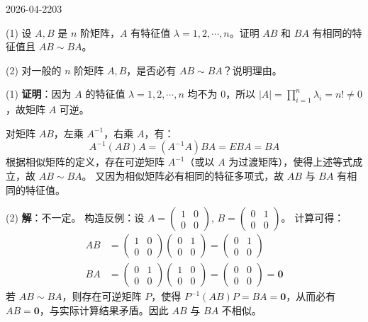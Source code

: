 \begin{mistake}{2026-04-22}{03}

\begin{problemcontent}
(1) 设 \(A, B\) 是 \(n\) 阶矩阵，\(A\) 有特征值 \(\lambda = 1, 2, \cdots, n\)。证明 \(AB\) 和 \(BA\) 有相同的特征值且 \(AB \sim BA\)。

(2) 对一般的 \(n\) 阶矩阵 \(A, B\)，是否必有 \(AB \sim BA\)？说明理由。
\end{problemcontent}

\begin{solutioncontent}
(1) \textbf{证明}：因为 \(A\) 的特征值 \(\lambda = 1, 2, \cdots, n\) 均不为 0，所以 \(|A| = \prod_{i=1}^n \lambda_i = n! \neq 0\)，故矩阵 \(A\) 可逆。

对矩阵 \(AB\)，左乘 \(A^{-1}\)，右乘 \(A\)，有：
\[
A^{-1}(AB)A = (A^{-1}A)BA = EBA = BA
\]
根据相似矩阵的定义，存在可逆矩阵 \(A^{-1}\)（或以 \(A\) 为过渡矩阵），使得上述等式成立，故 \(AB \sim BA\)。
又因为相似矩阵必有相同的特征多项式，故 \(AB\) 与 \(BA\) 有相同的特征值。

(2) \textbf{解}：不一定。
构造反例：设 \(A = \begin{pmatrix} 1 & 0 \\ 0 & 0 \end{pmatrix}\), \(B = \begin{pmatrix} 0 & 1 \\ 0 & 0 \end{pmatrix}\)。
计算可得：
\[
\begin{aligned}
AB &= \begin{pmatrix} 1 & 0 \\ 0 & 0 \end{pmatrix} \begin{pmatrix} 0 & 1 \\ 0 & 0 \end{pmatrix} = \begin{pmatrix} 0 & 1 \\ 0 & 0 \end{pmatrix} \\
BA &= \begin{pmatrix} 0 & 1 \\ 0 & 0 \end{pmatrix} \begin{pmatrix} 1 & 0 \\ 0 & 0 \end{pmatrix} = \begin{pmatrix} 0 & 0 \\ 0 & 0 \end{pmatrix} = \mathbf{0}
\end{aligned}
\]
若 \(AB \sim BA\)，则存在可逆矩阵 \(P\)，使得 \(P^{-1}(AB)P = BA = \mathbf{0}\)，从而必有 \(AB = \mathbf{0}\)，与实际计算结果矛盾。因此 \(AB\) 与 \(BA\) 不相似。
\end{solutioncontent}


\end{mistake}

